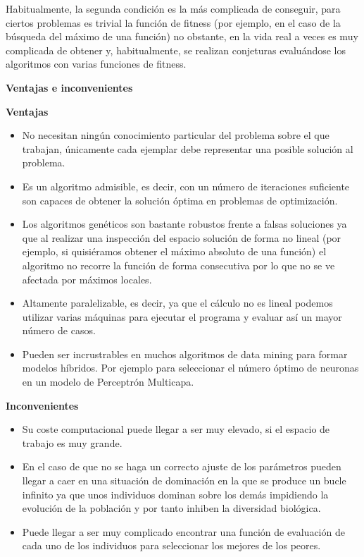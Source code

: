 \documentclass[
  a4paper,
  DIV=11,
  numbers=noendperiod]{scrreprt}
\begin{document}
Habitualmente, la segunda condición es la más complicada de conseguir,
para ciertos problemas es trivial la función de fitness (por ejemplo, en
el caso de la búsqueda del máximo de una función) no obstante, en la
vida real a veces es muy complicada de obtener y, habitualmente, se
realizan conjeturas evaluándose los algoritmos con varias funciones de
fitness.

\textbf{Ventajas e inconvenientes}

\textbf{Ventajas}

\begin{itemize}
\item
  No necesitan ningún conocimiento particular del problema sobre el que
  trabajan, únicamente cada ejemplar debe representar una posible
  solución al problema.
\item
  Es un algoritmo admisible, es decir, con un número de iteraciones
  suficiente son capaces de obtener la solución óptima en problemas de
  optimización.
\item
  Los algoritmos genéticos son bastante robustos frente a falsas
  soluciones ya que al realizar una inspección del espacio solución de
  forma no lineal (por ejemplo, si quisiéramos obtener el máximo
  absoluto de una función) el algoritmo no recorre la función de forma
  consecutiva por lo que no se ve afectada por máximos locales.
\item
  Altamente paralelizable, es decir, ya que el cálculo no es lineal
  podemos utilizar varias máquinas para ejecutar el programa y evaluar
  así un mayor número de casos.
\item
  Pueden ser incrustrables en muchos algoritmos de data mining para
  formar modelos híbridos. Por ejemplo para seleccionar el número óptimo
  de neuronas en un modelo de Perceptrón Multicapa.
\end{itemize}

\textbf{Inconvenientes}

\begin{itemize}
\item
  Su coste computacional puede llegar a ser muy elevado, si el espacio
  de trabajo es muy grande.
\item
  En el caso de que no se haga un correcto ajuste de los parámetros
  pueden llegar a caer en una situación de dominación en la que se
  produce un bucle infinito ya que unos individuos dominan sobre los
  demás impidiendo la evolución de la población y por tanto inhiben la
  diversidad biológica.
\item
  Puede llegar a ser muy complicado encontrar una función de evaluación
  de cada uno de los individuos para seleccionar los mejores de los
  peores.
\end{itemize}
\end{document}

